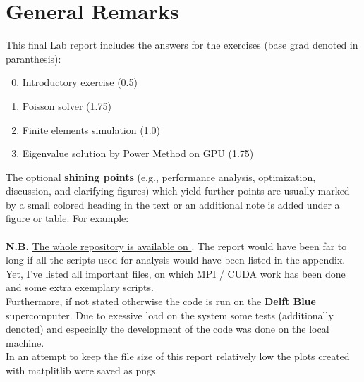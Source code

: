 \section*{General Remarks}
This final Lab report includes the answers for the exercises (base grad denoted in paranthesis):
\begin{enumerate}
    \setcounter{enumi}{-1}
    \item Introductory exercise (0.5)
    \item Poisson solver (1.75)
    \item Finite elements simulation (1.0)
    \item Eigenvalue solution by Power Method on GPU (1.75)
\end{enumerate}
The optional \textbf{shining points} (e.g., performance analysis, optimization, discussion, and
clarifying figures) which yield further points are usually marked by a small colored heading in the text or an additional note is added under a figure or table. For example:\\
 \\

\textbf{N.B.} \underline{The whole repository is available on }. The report would have been far to long if all the scripts used for analysis would have been listed in the appendix. Yet, I've listed all important files, on which MPI / CUDA work has been done and some extra exemplary scripts.\\

Furthermore, if not stated otherwise the code is run on the \textbf{Delft Blue} supercomputer. Due to exessive load on the system some tests (additionally denoted) and especially the development of the code was done on the local machine. \\

In an attempt to keep the file size of this report relatively low the plots created with matplitlib were saved as pngs. 